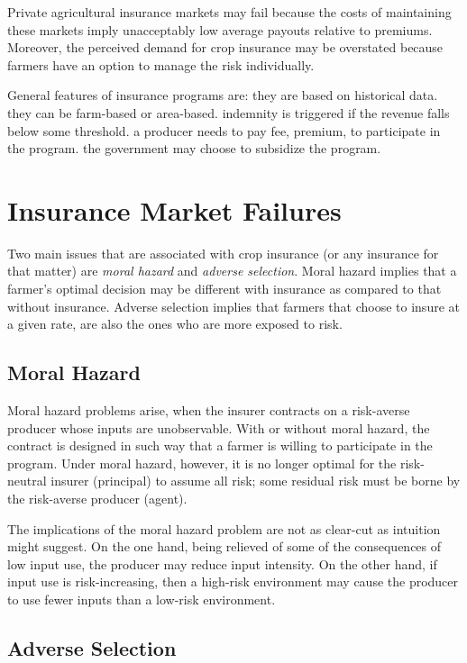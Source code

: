 \documentclass[
]{book}
\begin{document}
Private agricultural insurance markets may fail because the costs of maintaining these markets imply unacceptably low average payouts relative to premiums. Moreover, the perceived demand for crop insurance may be overstated because farmers have an option to manage the risk individually.

General features of insurance programs are: they are based on historical data. they can be farm-based or area-based. indemnity is triggered if the revenue falls below some threshold. a producer needs to pay fee, premium, to participate in the program. the government may choose to subsidize the program.

\hypertarget{insurance-market-failures}{%
\section{Insurance Market Failures}\label{insurance-market-failures}}

Two main issues that are associated with crop insurance (or any insurance for that matter) are \emph{moral hazard} and \emph{adverse selection}. Moral hazard implies that a farmer's optimal decision may be different with insurance as compared to that without insurance. Adverse selection implies that farmers that choose to insure at a given rate, are also the ones who are more exposed to risk.

\hypertarget{moral-hazard}{%
\subsection{Moral Hazard}\label{moral-hazard}}

Moral hazard problems arise, when the insurer contracts on a risk-averse producer whose inputs are unobservable. With or without moral hazard, the contract is designed in such way that a farmer is willing to participate in the program. Under moral hazard, however, it is no longer optimal for the risk-neutral insurer (principal) to assume all risk; some residual risk must be borne by the risk-averse producer (agent).

The implications of the moral hazard problem are not as clear-cut as intuition might suggest. On the one hand, being relieved of some of the consequences of low input use, the producer may reduce input intensity. On the other hand, if input use is risk-increasing, then a high-risk environment may cause the producer to use fewer inputs than a low-risk environment.

\hypertarget{adverse-selection}{%
\subsection{Adverse Selection}\label{adverse-selection}}
\end{document}
